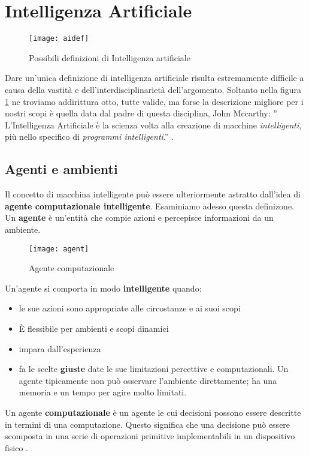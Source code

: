 \section{Intelligenza Artificiale}

\begin{figure}
    \texttt{[image: aidef]}
    \caption{Possibili definizioni di Intelligenza artificiale\cite{aima}}
    \label{fig:ai}
  \end{figure}
Dare un'unica definizione di intelligenza artificiale risulta estremamente difficile a causa della vastità
e dell'interdisciplinarietà dell'argomento. Soltanto nella figura \ref{fig:ai} ne troviamo addirittura otto, tutte valide, ma forse
la descrizione  migliore per i nostri scopi  è quella data dal padre di questa disciplina, John Mccarthy:
'' L'Intelligenza Artificiale è la scienza volta alla creazione di macchine  \emph{intelligenti},
più nello specifico di \emph{programmi intelligenti}.'' \cite{ai}.
\subsection{Agenti e ambienti}
Il concetto di macchina intelligente può essere ulteriormente
astratto dall'idea di \textbf{agente computazionale intelligente}. Esaminiamo adesso questa definizone.
Un \textbf{agente} è un'entità che compie azioni
e percepisce informazioni da un ambiente.

\begin{figure}
  \centering
  \texttt{[image: agent]}
  \caption{Agente computazionale\cite{aima}}
  \label{fig:agente}
\end{figure}

Un'agente si comporta in modo \textbf{intelligente} quando:
\begin{itemize}
  \item le sue azioni sono appropriate alle circostanze e ai suoi scopi
  \item È flessibile per ambienti e scopi dinamici
  \item impara dall'esperienza
  \item fa le scelte \textbf{giuste} date le sue limitazioni percettive e computazionali. Un agente tipicamente
  non può osservare l'ambiente direttamente; ha una memoria e un tempo per agire molto limitati.
\end{itemize}
 Un agente \textbf{computazionale} è un agente le cui decisioni possono essere descritte in termini di una
 computazione. Questo significa che una decisione può essere scomposta in una serie di operazioni primitive
 implementabili in un dispositivo fisico \cite{PooleMackworth17}.
